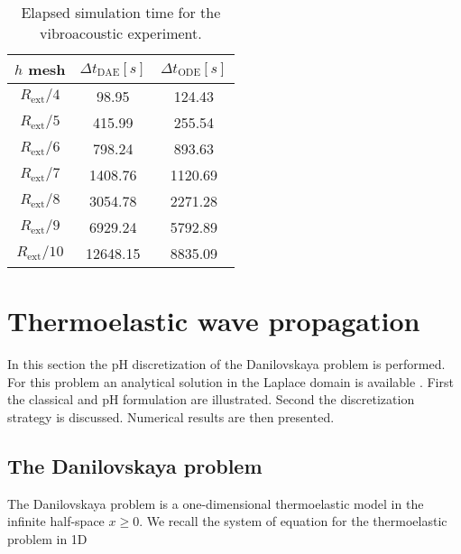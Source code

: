 \begin{table}[t]
	\centering
	\begin{tabular}{ccc}
		\hline 
		$h$ mesh & $\Delta t_{\text{DAE}} [s]$ & $\Delta t_{\text{ODE}} [s]$  \\ 
		\hline 
		$R_{\text{ext}}/4$ & 98.95 & 124.43 \\
		$R_{\text{ext}}/5$ & 415.99 & 255.54 \\
		$R_{\text{ext}}/6$ & 798.24 & 893.63 \\
		$R_{\text{ext}}/7$ & 1408.76 & 1120.69 \\
		$R_{\text{ext}}/8$ & 3054.78 & 2271.28 \\
		$R_{\text{ext}}/9$ & 6929.24 & 5792.89 \\
		$R_{\text{ext}}/10$ & 12648.15 & 8835.09 \\
		\hline 
	\end{tabular} 
	\vspace{1mm}
	\caption{Elapsed simulation time for the vibroacoustic experiment.}
	\label{tab:deltaT}
\end{table}


\section{Thermoelastic wave propagation}\label{sec:thelas_wave}

In this section the pH discretization of the Danilovskaya problem \cite{danilovskaya1950} is performed. For this problem an analytical solution in the Laplace domain is available \cite{balla1991}. First the classical and pH formulation are illustrated. Second the discretization strategy is discussed. Numerical results are then presented.

\subsection{The Danilovskaya problem}
The Danilovskaya problem is a one-dimensional thermoelastic model in the infinite half-space $x\ge 0$. We recall the system of equation for the thermoelastic problem in 1D

